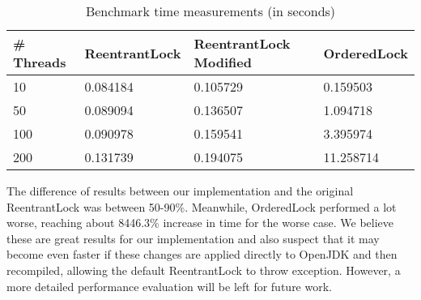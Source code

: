 \begin{table}
\begin{center}
\caption{Benchmark time measurements (in seconds)}
\begin{tabular}{|l|l|l|l|}
\hline
\# Threads & ReentrantLock & ReentrantLock Modified & OrderedLock \\
\hline
10 & 0.084184 & 0.105729 & 0.159503\\
50 & 0.089094 & 0.136507 & 1.094718\\
100 & 0.090978 & 0.159541 & 3.395974\\
200 & 0.131739 & 0.194075 & 11.258714\\
\hline
\end{tabular}
\end{center}
\end{table}

The difference of results between our implementation and the original ReentrantLock was between 50-90\%. Meanwhile, OrderedLock performed a lot worse, reaching about 8446.3\% increase in time for the worse case. We believe these are great results for our implementation and also suspect that it may become even faster if these changes are applied directly to OpenJDK and then recompiled, allowing the default ReentrantLock to throw exception. However, a more detailed performance evaluation will be left for future work.

